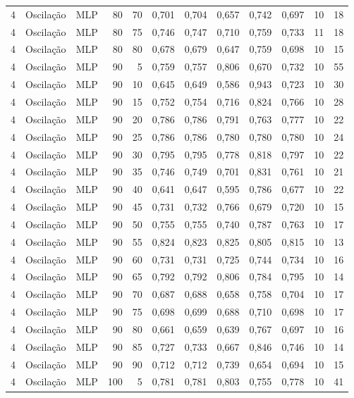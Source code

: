 \begin{longtable}{@{}rllrrrrrrrrr@{}}
4 & Oscilação & MLP & 80 & 70 & 0,701 & 0,704 & 0,657 & 0,742 & 0,697 & 10 & 18 \\
4 & Oscilação & MLP & 80 & 75 & 0,746 & 0,747 & 0,710 & 0,759 & 0,733 & 11 & 18 \\
4 & Oscilação & MLP & 80 & 80 & 0,678 & 0,679 & 0,647 & 0,759 & 0,698 & 10 & 15 \\
4 & Oscilação & MLP & 90 & 5 & 0,759 & 0,757 & 0,806 & 0,670 & 0,732 & 10 & 55 \\
4 & Oscilação & MLP & 90 & 10 & 0,645 & 0,649 & 0,586 & 0,943 & 0,723 & 10 & 30 \\
4 & Oscilação & MLP & 90 & 15 & 0,752 & 0,754 & 0,716 & 0,824 & 0,766 & 10 & 28 \\
4 & Oscilação & MLP & 90 & 20 & 0,786 & 0,786 & 0,791 & 0,763 & 0,777 & 10 & 22 \\
4 & Oscilação & MLP & 90 & 25 & 0,786 & 0,786 & 0,780 & 0,780 & 0,780 & 10 & 24 \\
4 & Oscilação & MLP & 90 & 30 & 0,795 & 0,795 & 0,778 & 0,818 & 0,797 & 10 & 22 \\
4 & Oscilação & MLP & 90 & 35 & 0,746 & 0,749 & 0,701 & 0,831 & 0,761 & 10 & 21 \\
4 & Oscilação & MLP & 90 & 40 & 0,641 & 0,647 & 0,595 & 0,786 & 0,677 & 10 & 22 \\
4 & Oscilação & MLP & 90 & 45 & 0,731 & 0,732 & 0,766 & 0,679 & 0,720 & 10 & 15 \\
4 & Oscilação & MLP & 90 & 50 & 0,755 & 0,755 & 0,740 & 0,787 & 0,763 & 10 & 17 \\
4 & Oscilação & MLP & 90 & 55 & 0,824 & 0,823 & 0,825 & 0,805 & 0,815 & 10 & 13 \\
4 & Oscilação & MLP & 90 & 60 & 0,731 & 0,731 & 0,725 & 0,744 & 0,734 & 10 & 16 \\
4 & Oscilação & MLP & 90 & 65 & 0,792 & 0,792 & 0,806 & 0,784 & 0,795 & 10 & 14 \\
4 & Oscilação & MLP & 90 & 70 & 0,687 & 0,688 & 0,658 & 0,758 & 0,704 & 10 & 17 \\
4 & Oscilação & MLP & 90 & 75 & 0,698 & 0,699 & 0,688 & 0,710 & 0,698 & 10 & 17 \\
4 & Oscilação & MLP & 90 & 80 & 0,661 & 0,659 & 0,639 & 0,767 & 0,697 & 10 & 16 \\
4 & Oscilação & MLP & 90 & 85 & 0,727 & 0,733 & 0,667 & 0,846 & 0,746 & 10 & 14 \\
4 & Oscilação & MLP & 90 & 90 & 0,712 & 0,712 & 0,739 & 0,654 & 0,694 & 10 & 15 \\
4 & Oscilação & MLP & 100 & 5 & 0,781 & 0,781 & 0,803 & 0,755 & 0,778 & 10 & 41 \\

\end{longtable}
